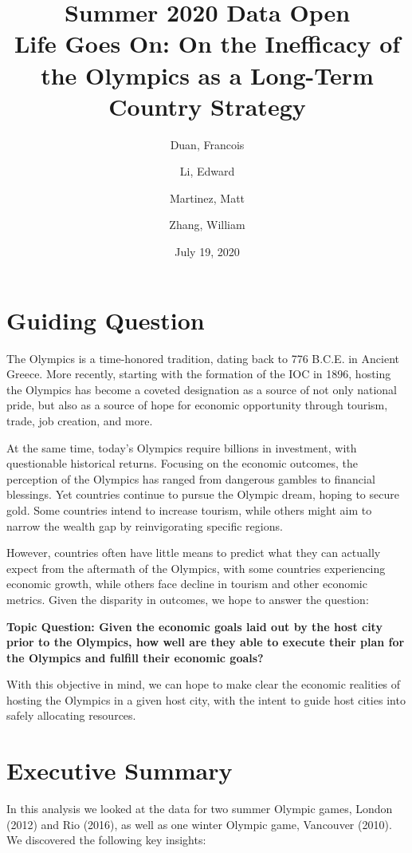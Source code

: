 \documentclass[11pt, twocolumn]{article}
\title{%
  \textbf{{\huge Summer 2020 Data Open} \\
  \large Life Goes On: On the Inefficacy of the Olympics as a Long-Term Country Strategy}}
\author{
  Duan, Francois
  \and
  Li, Edward
  \and
  Martinez, Matt
  \and
  Zhang, William
}
\date{July 19, 2020}
\begin{document}
\maketitle

\section{Guiding Question}

The Olympics is a time-honored tradition, dating back to 776 B.C.E. in Ancient Greece. More recently, starting with the formation of the IOC in 1896, hosting the Olympics has become a coveted designation as a source of not only national pride, but also as a source of hope for economic opportunity through tourism, trade, job creation, and more.

At the same time, today's Olympics require billions in investment, with questionable historical returns.
Focusing on the economic outcomes, the perception of the Olympics has ranged from dangerous gambles to financial blessings. Yet countries continue to pursue the Olympic dream, hoping to secure gold. Some countries intend to increase tourism, while others might aim to narrow the wealth gap by reinvigorating specific regions.

However, countries often have little means to predict what they can actually expect from the aftermath of the Olympics, with some countries experiencing economic growth, while others face decline in tourism and other economic metrics. Given the disparity in outcomes, we hope to answer the question:

\textbf{Topic Question: Given the economic goals laid out by the host city prior to the Olympics, how well are they able to execute their plan for the Olympics and fulfill their economic goals?}

With this objective in mind, we can hope to make clear the economic realities of hosting the Olympics in a given host city, with the intent to guide host cities into safely allocating resources.

\section{Executive Summary}
In this analysis we looked at the data for two summer Olympic games, London (2012) and Rio (2016), as well as one winter Olympic game, Vancouver (2010). We discovered the following key insights:
\end{document}
